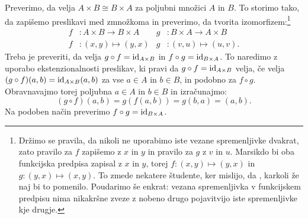 Preverimo, da velja $A \times B \cong B \times A$ za poljubni množici $A$ in $B$. To
storimo tako, da zapišemo preslikavi med zmnožkoma in preverimo, da tvorita
izomorfizem:\footnote{Držimo se pravila, da nikoli ne uporabimo iste vezane spremenljivke
  dvakrat, zato pravilo za $f$ zapišemo z $x$ in $y$ in pravilo za $g$ z $v$ in $u$.
  Marsikdo bi oba funkcijska predpisa zapisal z $x$ in $y$, torej
  $f : (x, y) \mapsto (y, x)$ in $g : (y, x) \mapsto (x, y)$. To zmede nekatere študente,
  ker mislijo, da , karkoli že
  naj bi to pomenilo. Poudarimo še enkrat: vezana spremenljivka v funkcijskem predpisu nima
  nikakršne zveze z nobeno drugo pojavitvijo iste spremenljivke kje drugje.}
%
\begin{align*}
  f &: A \times B \to B \times A &
  g &: B \times A \to A \times B \\
  f &: (x, y) \mapsto (y, x) &
  g &: (v, u) \mapsto (u, v).
\end{align*}
%
Treba je preveriti, da velja $g \circ f = \id[A \times B]$ in
$f \circ g = \id[B \times A]$. To naredimo z uporabo ekstenzionalnosti preslikav, ki pravi
da $g \circ f = \id[A \times B]$ velja, če velja $(g \circ f)(a,b) = \id[A \times B](a,b)$ za vse $a \in A$
in $b \in B$, in podobno za $f \circ g$. Obravnavajmo torej poljubna $a \in A$ in
$b \in B$ in izračunajmo:
%
\begin{equation*}
  (g \circ f)(a, b) =
  g (f (a, b)) = g (b, a) = (a, b).
\end{equation*}
%
Na podoben način preverimo $f \circ g = \id[B \times A]$.

